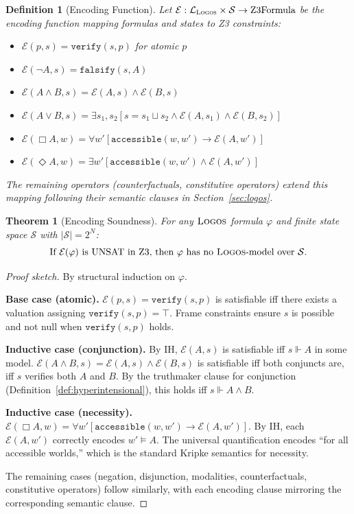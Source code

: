 \documentclass[pdflatex,sn-mathphys-num]{sn-jnl}
\newcommand{\nec}{\Box}                     %
\newcommand{\poss}{\Diamond}                %
\newcommand{\imp}{\to}                      %
\newcommand{\lneg}{\neg}                    %
\newcommand{\statespace}{\mathcal{S}}       %
\newcommand{\fuse}[2]{#1 \sqcup #2}         %
\newcommand{\verifies}{\Vdash}              %
\newcommand{\theorylogos}{\textsc{Logos}}
\newcommand{\zverify}{\texttt{verify}}
\newcommand{\zfalsify}{\texttt{falsify}}
\newcommand{\zaccessible}{\texttt{accessible}}
\theoremstyle{thmstyleone}
\newtheorem{theorem}{Theorem}
\theoremstyle{thmstyletwo}
\theoremstyle{thmstylethree}
\newtheorem{definition}{Definition}
\begin{document}
\begin{definition}[Encoding Function]\label{def:encoding}
Let $\mathcal{E}: \mathcal{L}_{\theorylogos} \times \statespace \to \text{Z3Formula}$ be the encoding function mapping formulas and states to Z3 constraints:
\begin{itemize}
    \item $\mathcal{E}(p, s) = \zverify(s, p)$ for atomic $p$
    \item $\mathcal{E}(\lneg A, s) = \zfalsify(s, A)$
    \item $\mathcal{E}(A \land B, s) = \mathcal{E}(A, s) \land \mathcal{E}(B, s)$
    \item $\mathcal{E}(A \lor B, s) = \exists s_1, s_2[s = \fuse{s_1}{s_2} \land \mathcal{E}(A, s_1) \land \mathcal{E}(B, s_2)]$
    \item $\mathcal{E}(\nec A, w) = \forall w'[\zaccessible(w,w') \imp \mathcal{E}(A, w')]$
    \item $\mathcal{E}(\poss A, w) = \exists w'[\zaccessible(w,w') \land \mathcal{E}(A, w')]$
\end{itemize}
The remaining operators (counterfactuals, constitutive operators) extend this mapping following their semantic clauses in Section~\ref{sec:logos}.
\end{definition}

\begin{theorem}[Encoding Soundness]\label{thm:soundness}
For any $\theorylogos$ formula $\varphi$ and finite state space $\statespace$ with $|\statespace| = 2^N$:
\[
\text{If } \mathcal{E}(\varphi) \text{ is UNSAT in Z3, then } \varphi \text{ has no } \theorylogos\text{-model over } \statespace.
\]
\end{theorem}

\begin{proof}[Proof sketch]
By structural induction on $\varphi$.

\textbf{Base case (atomic).}
$\mathcal{E}(p, s) = \zverify(s, p)$ is satisfiable iff there exists a valuation assigning $\zverify(s, p) = \top$.
Frame constraints ensure $s$ is possible and not null when $\zverify(s,p)$ holds.

\textbf{Inductive case (conjunction).}
By IH, $\mathcal{E}(A, s)$ is satisfiable iff $s \verifies A$ in some model.
$\mathcal{E}(A \land B, s) = \mathcal{E}(A, s) \land \mathcal{E}(B, s)$ is satisfiable iff both conjuncts are, iff $s$ verifies both $A$ and $B$.
By the truthmaker clause for conjunction (Definition~\ref{def:hyperintensional}), this holds iff $s \verifies A \land B$.

\textbf{Inductive case (necessity).}
$\mathcal{E}(\nec A, w) = \forall w'[\zaccessible(w,w') \imp \mathcal{E}(A, w')]$.
By IH, each $\mathcal{E}(A, w')$ correctly encodes $w' \models A$.
The universal quantification encodes ``for all accessible worlds,'' which is the standard Kripke semantics for necessity.

The remaining cases (negation, disjunction, modalities, counterfactuals, constitutive operators) follow similarly, with each encoding clause mirroring the corresponding semantic clause.
\end{proof}
\end{document}
